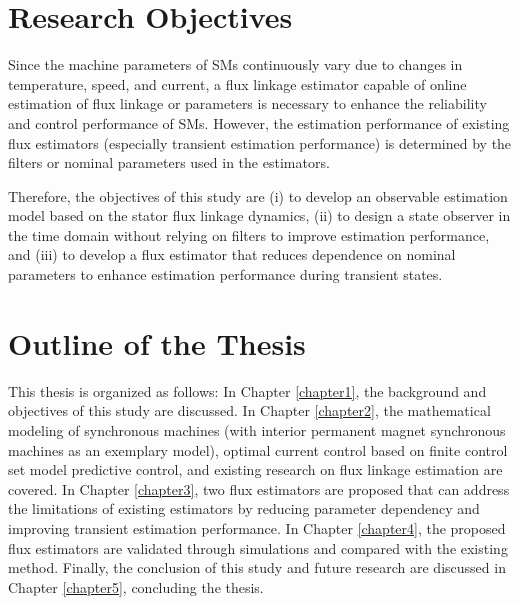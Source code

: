\section{Research Objectives} \label{chap1:sec2}

Since the machine parameters of SMs continuously vary due to changes in temperature, speed, and current, a flux linkage estimator capable of online estimation of flux linkage or parameters is necessary to enhance the reliability and control performance of SMs. However, the estimation performance of existing flux estimators (especially transient estimation performance) is determined by the filters or nominal parameters used in the estimators. 

Therefore, the objectives of this study are (i) to develop an observable estimation model based on the stator flux linkage dynamics, (ii) to design a state observer in the time domain without relying on filters to improve estimation performance, and (iii) to develop a flux estimator that reduces dependence on nominal parameters to enhance estimation performance during transient states.

\section{Outline of the Thesis} \label{chap1:sec3}
This thesis is organized as follows: In Chapter \ref{chapter1}, the background and objectives of this study are discussed. In Chapter \ref{chapter2}, the mathematical modeling of synchronous machines (with interior permanent magnet synchronous machines as an exemplary model), optimal current control based on finite control set model predictive control, and existing research on flux linkage estimation are covered. In Chapter \ref{chapter3}, two flux estimators are proposed that can address the limitations of existing estimators by reducing parameter dependency and improving transient estimation performance. In Chapter \ref{chapter4}, the proposed flux estimators are validated through simulations and compared with the existing method. Finally, the conclusion of this study and future research are discussed in Chapter \ref{chapter5}, concluding the thesis.